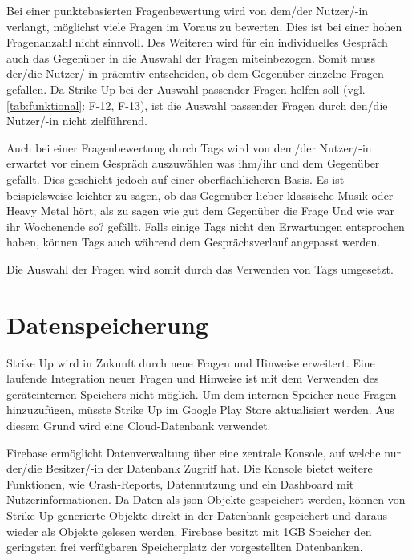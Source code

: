 Bei einer punktebasierten Fragenbewertung wird von dem/der Nutzer/-in verlangt, möglichst viele Fragen im Voraus zu bewerten. Dies ist bei einer hohen Fragenanzahl nicht sinnvoll. Des Weiteren wird für ein individuelles Gespräch auch das Gegenüber in die Auswahl der Fragen miteinbezogen. Somit muss der/die Nutzer/-in präemtiv entscheiden, ob dem Gegenüber einzelne Fragen gefallen. Da Strike Up bei der Auswahl passender Fragen helfen soll (vgl. \ref{tab:funktional}: F-12, F-13), ist die Auswahl passender Fragen durch den/die Nutzer/-in nicht zielführend.

Auch bei einer Fragenbewertung durch Tags wird von dem/der Nutzer/-in erwartet vor einem Gespräch auszuwählen was ihm/ihr und dem Gegenüber gefällt. Dies geschieht jedoch auf einer oberflächlicheren Basis. Es ist beispielsweise leichter zu sagen, ob das Gegenüber lieber klassische Musik oder Heavy Metal hört, als zu sagen wie gut dem Gegenüber die Frage \glqq{}Und wie war ihr Wochenende so?\grqq{} gefällt. \newline
Falls einige Tags nicht den Erwartungen entsprochen haben, können Tags auch während dem Gesprächsverlauf angepasst werden.

Die Auswahl der Fragen wird somit durch das Verwenden von Tags umgesetzt.


\section{Datenspeicherung}
\label{sec:bewertung_datenspeicherung}

Strike Up wird in Zukunft durch neue Fragen und Hinweise erweitert. Eine laufende Integration neuer Fragen und Hinweise ist mit dem Verwenden des geräteinternen Speichers nicht möglich.
Um dem internen Speicher neue Fragen hinzuzufügen, müsste Strike Up im Google Play Store aktualisiert werden. Aus diesem Grund wird eine Cloud-Datenbank verwendet.

Firebase ermöglicht Datenverwaltung über eine zentrale Konsole, auf welche nur der/die Besitzer/-in der Datenbank Zugriff hat. Die Konsole bietet weitere Funktionen, wie Crash-Reports,
Datennutzung und ein Dashboard mit Nutzerinformationen. \newline
Da Daten als \gls{json}-Objekte gespeichert werden, können von Strike Up generierte Objekte direkt in der Datenbank gespeichert und daraus wieder als Objekte gelesen werden. \newline
Firebase besitzt mit 1GB Speicher den geringsten frei verfügbaren Speicherplatz der vorgestellten Datenbanken.

